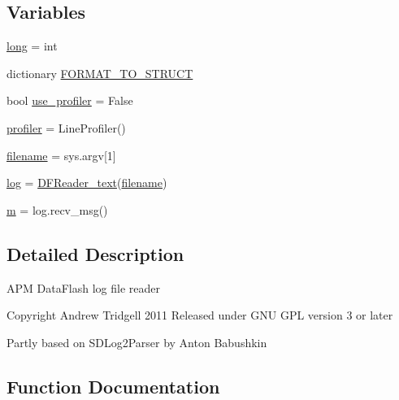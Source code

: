 \subsection*{Variables}
\begin{DoxyCompactItemize}
\item 
\mbox{\hyperlink{namespacepymavlink_1_1DFReader_ac95074392c85e56dacbbcd276f0bec8f}{long}} = int
\item 
dictionary \mbox{\hyperlink{namespacepymavlink_1_1DFReader_a616c9c66a8addbc867725f6611b9645c}{F\+O\+R\+M\+A\+T\+\_\+\+T\+O\+\_\+\+S\+T\+R\+U\+CT}}
\item 
bool \mbox{\hyperlink{namespacepymavlink_1_1DFReader_a2b9211b6b6b7164d29bd33019992cadb}{use\+\_\+profiler}} = False
\item 
\mbox{\hyperlink{namespacepymavlink_1_1DFReader_a179a528de5d43521d3f2f71e8dc137ed}{profiler}} = Line\+Profiler()
\item 
\mbox{\hyperlink{namespacepymavlink_1_1DFReader_a9653e10b2651c68cf8b171d8dd60f10c}{filename}} = sys.\+argv\mbox{[}1\mbox{]}
\item 
\mbox{\hyperlink{namespacepymavlink_1_1DFReader_abc349a115aebbad3bf47cfd5e1e4f983}{log}} = \mbox{\hyperlink{classpymavlink_1_1DFReader_1_1DFReader__text}{D\+F\+Reader\+\_\+text}}(\mbox{\hyperlink{namespacepymavlink_1_1DFReader_a9653e10b2651c68cf8b171d8dd60f10c}{filename}})
\item 
\mbox{\hyperlink{namespacepymavlink_1_1DFReader_a41dcad484f9dfcaca656786d0882f168}{m}} = log.\+recv\+\_\+msg()
\end{DoxyCompactItemize}


\subsection{Detailed Description}
\begin{DoxyVerb}APM DataFlash log file reader

Copyright Andrew Tridgell 2011
Released under GNU GPL version 3 or later

Partly based on SDLog2Parser by Anton Babushkin
\end{DoxyVerb}
 

\subsection{Function Documentation}
\mbox{\label{namespacepymavlink_1_1DFReader_ae34df4fd2613fd70e018a0d4f460e082}} 
